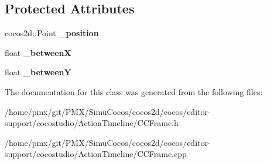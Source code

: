 \subsection*{Protected Attributes}
\begin{DoxyCompactItemize}
\item 
\mbox{\label{classPositionFrame_accd1394fffc5ed7cfccf452776d4c685}} 
cocos2d\+::\+Point {\bfseries \+\_\+position}
\item 
\mbox{\label{classPositionFrame_a1d631535256d04452324fa1eee065194}} 
float {\bfseries \+\_\+betweenX}
\item 
\mbox{\label{classPositionFrame_a5152d10e147e8cad9b093ef0d3623939}} 
float {\bfseries \+\_\+betweenY}
\end{DoxyCompactItemize}


The documentation for this class was generated from the following files\+:\begin{DoxyCompactItemize}
\item 
/home/pmx/git/\+P\+M\+X/\+Simu\+Cocos/cocos2d/cocos/editor-\/support/cocostudio/\+Action\+Timeline/C\+C\+Frame.\+h\item 
/home/pmx/git/\+P\+M\+X/\+Simu\+Cocos/cocos2d/cocos/editor-\/support/cocostudio/\+Action\+Timeline/C\+C\+Frame.\+cpp\end{DoxyCompactItemize}
